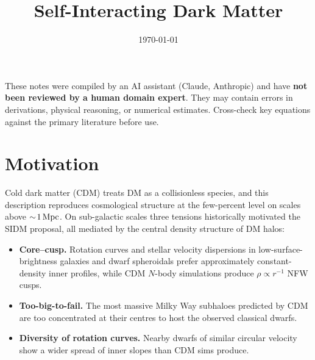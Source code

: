 \documentclass[12pt]{article}
\title{Self-Interacting Dark Matter}
\author{}
\date{\today}
\begin{document}
\maketitle
\tableofcontents
\newpage

\begin{tcolorbox}[colback=yellow!10!white, colframe=orange!75!black,
                  title={\bfseries Disclaimer}]
These notes were compiled by an AI assistant (Claude, Anthropic) and have
\textbf{not been reviewed by a human domain expert}.  They may contain
errors in derivations, physical reasoning, or numerical estimates.
Cross-check key equations against the primary literature before use.
\end{tcolorbox}
\vspace{0.5em}

\section{Motivation}
\label{sec:motivation}

Cold dark matter (CDM) treats DM as a collisionless species, and this
description reproduces cosmological structure at the few-percent level
on scales above $\sim\!1\,{\rm Mpc}$.  On sub-galactic scales three
tensions historically motivated the SIDM proposal, all mediated by the
central density structure of DM halos:

\begin{itemize}
  \item \textbf{Core--cusp.}  Rotation curves and stellar velocity
        dispersions in low-surface-brightness galaxies and dwarf
        spheroidals prefer approximately constant-density inner
        profiles, while CDM $N$-body simulations produce $\rho\propto
        r^{-1}$ NFW cusps.
  \item \textbf{Too-big-to-fail.}  The most massive Milky Way
        subhaloes predicted by CDM are too concentrated at their
        centres to host the observed classical dwarfs.
  \item \textbf{Diversity of rotation curves.}  Nearby dwarfs of
        similar circular velocity show a wider spread of inner slopes
        than CDM sims produce.
\end{itemize}
\end{document}
